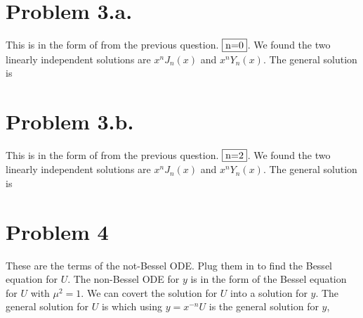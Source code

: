 \documentclass{article}
\begin{document}
\section*{Problem 3.a.}
This is in the form of  from the previous question. $\fbox{n=0}$. We found the two linearly independent solutions are $x^n J_n (x)$ and $x^n Y_n(x)$. The general solution is
\section*{Problem 3.b.}
This is in the form of  from the previous question. $\fbox{n=2}$. We found the two linearly independent solutions are $x^n J_n (x)$ and $x^n Y_n(x)$. The general solution is
\section*{Problem 4}
These are the terms of the not-Bessel ODE. Plug them in to find the Bessel equation for $U$.
The non-Bessel ODE for $y$ is in the form of the Bessel equation for $U$ with $\boxed{\mu^2=1}$. We can covert the solution for $U$ into a solution for $y$. The general solution for $U$ is
which using $y=x^{-n}U$ is the general solution for $y$,
\end{document}
